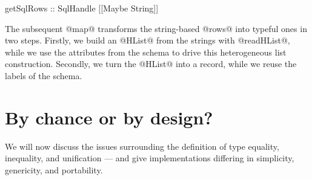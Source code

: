 \documentclass[nocopyrightspace,preprint]{sigplan-proc}
\begin{document}
\begin{code}
 getSqlRows :: SqlHandle [[Maybe String]]
\end{code}

The subsequent @map@ transforms the string-based @rows@ into typeful
ones in two steps. Firstly, we build an @HList@ from the strings with
@readHList@, while we use the attributes from the schema to drive this
heterogeneous list construction. Secondly, we turn the @HList@ into a
record, while we reuse the labels of the schema.






\section{By chance or by design?}
\label{S:chance}

We will now discuss the issues surrounding the definition of type
equality, inequality, and unification --- and give implementations
differing in simplicity, genericity, and portability.
\end{document}
